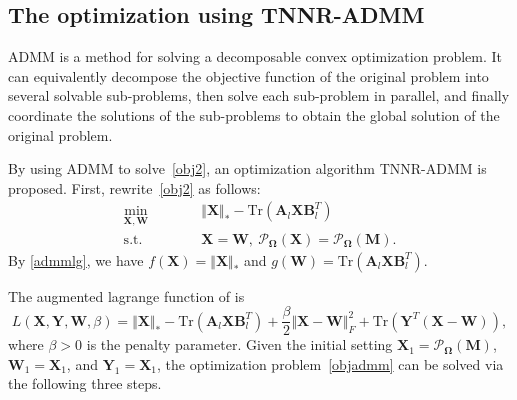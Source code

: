 \documentclass{article}
\begin{document}
{\subsection{The optimization using TNNR-ADMM}
ADMM is a method for solving a decomposable convex optimization problem. It can equivalently decompose the objective function of the original problem into several solvable sub-problems, then solve each sub-problem in parallel, and finally coordinate the solutions of the sub-problems to obtain the global solution of the original problem.

By using ADMM to solve~\eqref{obj2}, an optimization algorithm TNNR-ADMM is proposed. First, rewrite~\eqref{obj2} as follows:
\begin{equation}
    \begin{aligned}
        \underset{\mathbf X,\mathbf W}{\min}\qquad&\quad \Vert\mathbf X \Vert_* - \text{Tr}(\mathbf A_l\mathbf X\mathbf B_l^T) \\
        \text{s.t.}\qquad&\quad \mathbf X=\mathbf W, \ \mathcal{P}_{\mathbf\Omega}(\mathbf X) =  \mathcal{P}_{\mathbf\Omega}(\mathbf M).
    \end{aligned}\label{objadmm}
\end{equation}
By \eqref{admmlg}, we have $f(\mathbf X)=\Vert\mathbf X \Vert_*$ and $g(\mathbf W) = \text{Tr}(\mathbf A_l\mathbf X\mathbf B_l^T)$. 

The augmented lagrange function of is 
\begin{equation}
    L(\mathbf X,\mathbf Y,\mathbf W,\beta) = \Vert\mathbf X \Vert_* - \text{Tr}(\mathbf A_l\mathbf X\mathbf B_l^T) + \frac{\beta}{2}\Vert\mathbf X-\mathbf W \Vert_F^2 + \text{Tr}(\mathbf Y^T(\mathbf X-\mathbf W)),
\end{equation}
where $\beta > 0$ is  the penalty parameter. Given the initial setting $\mathbf X_1 = \mathcal{P}_{\mathbf\Omega}(\mathbf M)$, $\mathbf W_1 =\mathbf X_1$, and $\mathbf Y_1 =\mathbf X_1$, the optimization problem~\eqref{objadmm} can be solved via the following three steps.

}
\end{document}
